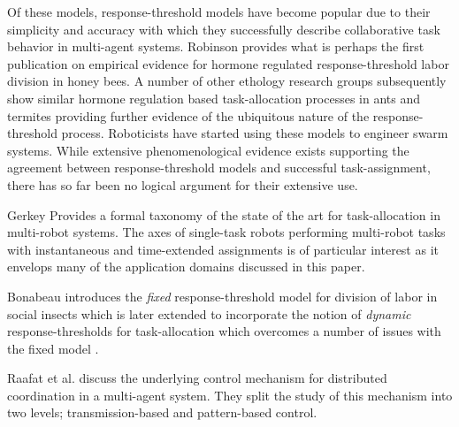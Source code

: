\documentclass{nature}
\begin{document}
Of these models, response-threshold models have become popular due to their simplicity and accuracy with which they successfully describe collaborative task behavior in multi-agent systems. Robinson \cite{Robinson1987} provides what is perhaps the first publication on empirical evidence for hormone regulated response-threshold labor division in honey bees. A number of other ethology research groups subsequently show similar hormone regulation based task-allocation processes in ants and termites providing further evidence of the ubiquitous nature of the response-threshold process. Roboticists have started using these models to engineer swarm systems. While extensive phenomenological evidence exists supporting the agreement between response-threshold models and successful task-assignment, there has so far been no logical argument for their extensive use.


Gerkey \cite{Gerkey2004} Provides a formal taxonomy of the state of the art for task-allocation in multi-robot systems. The axes of single-task robots performing multi-robot tasks with instantaneous and time-extended assignments is of particular interest as it envelops many of the application domains discussed in this paper.


Bonabeau \cite{Bonabeau1996} introduces the \emph{fixed} response-threshold model for division of labor in social insects which is later extended to incorporate the notion of \emph{dynamic} response-thresholds for task-allocation which overcomes a number of issues with the fixed model \cite{Theraulaz1998}.


\cite{Bonabeau2000}

\cite{Krieger2000}

\cite{Kube2000}

\cite{Pynadath2002}

\cite{Conradt2003}

\cite{Mataric2003}

\cite{Gerkey2003}

\cite{Conradt2005}

Raafat et al. \cite{Raafat2009} discuss the underlying control mechanism for distributed coordination in a multi-agent system. They split the study of this mechanism into two levels; transmission-based and pattern-based control. 
\end{document}
